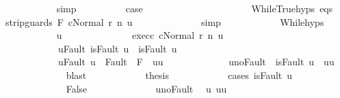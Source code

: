 \begin{isabellebody}
\ \ \ \ \ \ \ \ \ \ \isamarkupfalse%
\ simp\isanewline
\ \ \ \ \ \ \ \ \isamarkupfalse%
\ {\isacharquery}case\isanewline
\ \ \ \ \ \ \ \ \isamarkupfalse%
\ {\isacharminus}\isanewline
\ \ \ \ \ \ \ \ \ \ \isamarkupfalse%
\ WhileTrue{\isachardot}hyps\ eqs\ \isamarkupfalse%
\ {\isachardoublequoteopen}{\isasymGamma}{\isasymturnstile}{\isasymlangle}strip{\isacharunderscore}guards\ F\ c{\isacharcomma}Normal\ r{\isasymrangle}\ {\isacharequal}n{\isasymRightarrow}\ u{\isachardoublequoteclose}\isanewline
\ \ \ \ \ \ \ \ \ \ \ \ \isamarkupfalse%
\ simp\isanewline
\ \ \ \ \ \ \ \ \ \ \isamarkupfalse%
\ While{\isachardot}hyps\isanewline
\ \ \ \ \ \ \ \ \ \ \isamarkupfalse%
\ u{\isacharprime}\ \ \isanewline
\ \ \ \ \ \ \ \ \ \ \ \ exec{\isacharunderscore}c{\isacharcolon}\ {\isachardoublequoteopen}{\isasymGamma}{\isasymturnstile}{\isasymlangle}c{\isacharcomma}Normal\ r{\isasymrangle}\ {\isacharequal}n{\isasymRightarrow}\ u{\isacharprime}{\isachardoublequoteclose}\ \isanewline
\ \ \ \ \ \ \ \ \ \ \ \ u{\isacharunderscore}Fault{\isacharcolon}\ {\isachardoublequoteopen}isFault\ u\ {\isasymlongrightarrow}\ isFault\ u{\isacharprime}{\isachardoublequoteclose}\ \isanewline
\ \ \ \ \ \ \ \ \ \ \ \ u{\isacharprime}{\isacharunderscore}Fault{\isacharcolon}\ {\isachardoublequoteopen}u{\isacharprime}\ {\isasymin}\ Fault\ {\isacharbackquote}\ {\isacharparenleft}{\isacharminus}F{\isacharparenright}\ {\isasymlongrightarrow}\ u{\isacharprime}{\isacharequal}u{\isachardoublequoteclose}\ \isanewline
\ \ \ \ \ \ \ \ \ \ \ \ u{\isacharprime}{\isacharunderscore}noFault{\isacharcolon}\ {\isachardoublequoteopen}{\isasymnot}\ isFault\ u{\isacharprime}\ {\isasymlongrightarrow}\ u{\isacharprime}{\isacharequal}u{\isachardoublequoteclose}\isanewline
\ \ \ \ \ \ \ \ \ \ \ \ \isamarkupfalse%
\ blast\isanewline
\ \ \ \ \ \ \ \ \ \ \isamarkupfalse%
\ {\isacharquery}thesis\isanewline
\ \ \ \ \ \ \ \ \ \ \isamarkupfalse%
\ {\isacharparenleft}cases\ {\isachardoublequoteopen}isFault\ u{\isacharprime}{\isachardoublequoteclose}{\isacharparenright}\isanewline
\ \ \ \ \ \ \ \ \ \ \ \ \isamarkupfalse%
\ False\isanewline
\ \ \ \ \ \ \ \ \ \ \ \ \isamarkupfalse%
\ u{\isacharprime}{\isacharunderscore}noFault\ \isamarkupfalse%
\ u{\isacharprime}{\isacharcolon}\ {\isachardoublequoteopen}u{\isacharprime}{\isacharequal}u{\isachardoublequoteclose}\ \isamarkupfalse%

\end{isabellebody}
